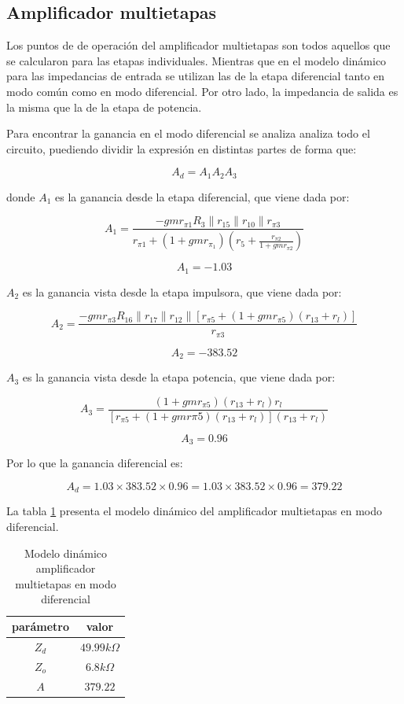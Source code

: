 \subsection{Amplificador multietapas}

Los puntos de de operación del amplificador multietapas son todos aquellos que se calcularon para las etapas individuales. Mientras que en el modelo dinámico para las impedancias de entrada se utilizan las de la etapa diferencial tanto en modo común como en modo diferencial. Por otro lado, la impedancia de salida es la misma que la de la etapa de potencia.


Para encontrar la ganancia en el modo diferencial se analiza analiza todo el circuito, puediendo dividir la expresión en distintas partes de forma que:

$$ A_d = A_1 A_2 A_3 $$

donde $A_1$ es la ganancia desde la etapa diferencial, que viene dada por:

$$ A_1 = \frac{-gmr_{\pi1} R_3 \parallel r_{15} \parallel r_{10} \parallel r_{\pi3}}{r_{\pi1} + (1+ gmr_{\pi_1})(r_5 + \frac{r_{\pi2}}{1 + gmr_{\pi2}})}$$

 $$A_1 = - 1.03 $$

 $A_2$ es la ganancia vista desde la etapa impulsora, que viene dada por:

 $$ A_2 = \frac{-gmr_{\pi3} R_{16} \parallel r_{17} \parallel r_{12} \parallel [r_{\pi5} + (1 + gmr_{\pi 5})(r_{13} + r_l)]}{r_{\pi 3}}$$

 $$A_2 =- 383.52 $$

 $A_3$ es la ganancia vista desde la etapa potencia, que viene dada por:

 $$ A_3 = \frac{(1 + gmr_{\pi5})(r_{13} + r_l)r_l}{[r_{\pi 5} + (1 + gmr\pi5)(r_{13} + r_l)](r_{13} + r_l)}$$

 $$A_3 = 0.96 $$

Por lo que la ganancia diferencial es: 

$$ A_d = 1.03 \times 383.52 \times 0.96 = 1.03 \times 383.52 \times 0.96 = 379.22 $$

La tabla \ref{tab:met-amp-multietapas-mod-diferencial} presenta el modelo dinámico del amplificador multietapas en modo diferencial.

\begin{table}[ht]
    \centering
    \begin{tabular}{|c|c|}
        \hline
        parámetro & valor  \\
        \hline
        $Z_d$ & $49.99k\Omega$ \\
        \hline
        $Z_o$ & $6.8k\Omega$ \\
        \hline
        $A$ & $379.22$ \\
        \hline
    \end{tabular}
    \caption{Modelo dinámico amplificador multietapas en modo diferencial}
    \label{tab:met-amp-multietapas-mod-diferencial}
\end{table}

